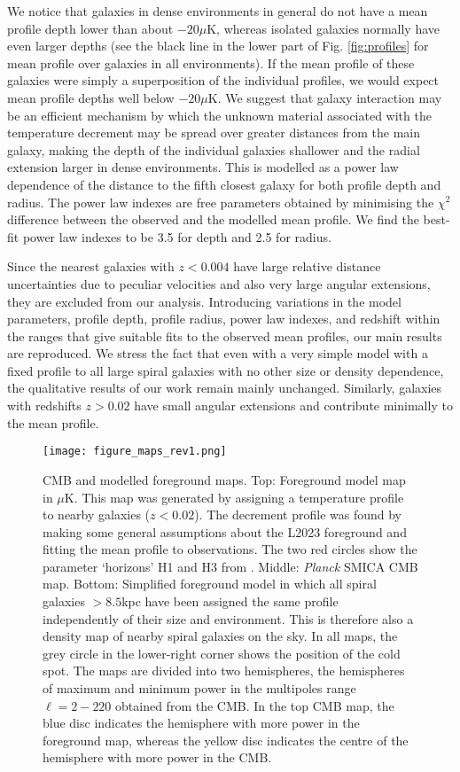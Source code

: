 \documentclass{aa}
\begin{document}
We notice that galaxies in dense environments in general do not have a mean profile depth lower than about $-20 \mu\textrm{K,}$ whereas isolated galaxies normally have even larger depths (see the black line in the lower part of Fig. \ref{fig:profiles} for mean profile over galaxies in all environments). If the mean profile of these galaxies were simply a superposition of the individual profiles, we would expect mean profile depths well below $-20 \mu\textrm{K}$. We suggest that galaxy interaction may be an efficient mechanism by which the unknown material associated with the temperature decrement may be spread over greater distances from the main galaxy, making the depth of the individual galaxies shallower and the radial extension larger in dense environments. This is modelled as a power law dependence of the distance to the fifth closest galaxy for both profile depth and radius. The power law indexes are free parameters obtained by minimising the $\chi^2$ difference between the observed and the modelled mean profile. We find the best-fit power law indexes to be 3.5 for depth and 2.5 for radius.

Since the nearest galaxies with $z<0.004$ have large relative distance uncertainties due to peculiar velocities and also very large angular extensions, they are excluded from our analysis. Introducing variations in the model parameters, profile depth, profile radius, power law indexes, and redshift within the ranges that give suitable fits to the observed mean profiles, our main results are reproduced. We stress the fact that even with a very simple model with a fixed profile to all large spiral galaxies with no other size or density dependence, the qualitative results of our work remain mainly unchanged. Similarly, galaxies with redshifts $z>0.02$ have small angular extensions and contribute minimally to the mean profile.

\begin{figure}[htbp]
  \centering
  \texttt{[image: figure\_maps\_rev1.png]}
     \caption{CMB and modelled foreground maps. Top: Foreground model map in $\mu$K. This map was generated by assigning a temperature profile to nearby galaxies ($z<0.02$). The decrement profile was found by making some general assumptions about the L2023 foreground and fitting the mean profile to observations. The two red circles show the parameter `horizons' H1 and H3 from \cite{paramhorizons}. Middle: \textit{Planck} SMICA CMB map. Bottom: Simplified foreground model in which all spiral galaxies $>8.5$\;kpc have been assigned the same profile independently of their size and environment. This is therefore also a density map of nearby spiral galaxies on the sky. In all maps, the grey circle in the lower-right corner shows the position of the cold spot. The maps are divided into two hemispheres, the hemispheres of maximum and minimum power in the multipoles range $\ell=2-220$ obtained from the CMB. In the top CMB map, the blue disc indicates the hemisphere with more power in the foreground map, whereas the yellow disc indicates the centre of the hemisphere with more power in the CMB. }
     \label{fig:maps}
\end{figure}
\end{document}

